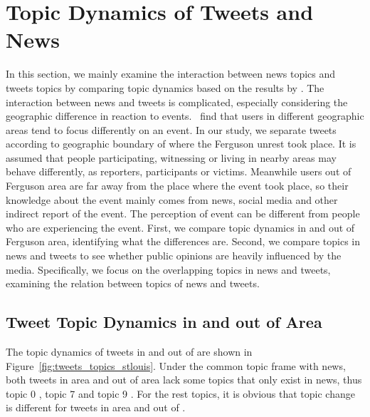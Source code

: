 \section{Topic Dynamics of Tweets and News}
\label{sec:top}

In this section, we mainly examine the interaction between news topics and tweets topics by comparing topic dynamics based on the results by \stlda. The interaction between news and tweets is complicated, especially considering the geographic difference in reaction to events.~ find that users in different geographic areas tend to focus differently on an event. In our study, we separate tweets according to geographic boundary of \stlouis where the Ferguson unrest took place. It is assumed that people participating, witnessing or living in nearby areas may behave differently, as reporters, participants or victims. Meanwhile users out of Ferguson area are far away from the place where the event took place, so their knowledge about the event mainly comes from news, social media and other indirect report of the event. The perception of event can be different from people who are experiencing the event. First, we compare topic dynamics in and out of Ferguson area, identifying what the differences are. Second, we compare topics in news and tweets to see whether public opinions are heavily influenced by the media. Specifically, we focus on the overlapping topics in news and tweets, examining the relation between topics of news and tweets.

\subsection{Tweet Topic Dynamics in and out of \stlouis Area}
\label{subsec:tweet_topic}

The topic dynamics of tweets in and out of \stlouis are shown in Figure~\ref{fig:tweets_topics_stlouis}. Under the common topic frame with news, both tweets in \stlouis area and out of \stlouis area lack some topics that only exist in news, thus topic 0 \obamatalk, topic 7 \shootincident and topic 9 \raceandcommunity. For the rest topics, it is obvious that topic change is different for tweets in \stlouis area and out of \stlouis.

